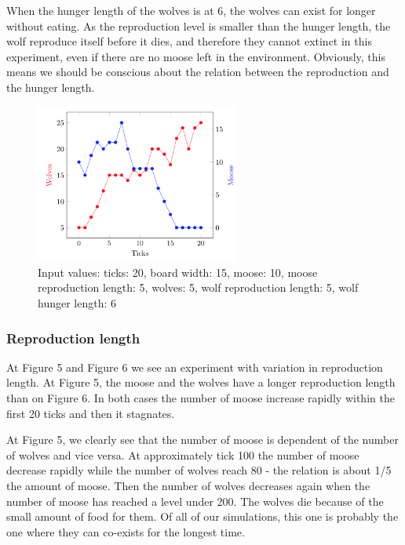 \documentclass[a4paper]{report}
\begin{document}
When the hunger length of the wolves is at 6, the wolves can exist for longer without eating. As the reproduction level is smaller than the hunger length, the wolf reproduce itself before it dies, and therefore they cannot extinct in this experiment, even if there are no moose left in the environment. Obviously, this means we should be conscious about the relation between the reproduction and the hunger length.

\begin{figure}[H]
\centering
\includegraphics[width=0.60\textwidth]{Experiments/sim_hunlen_a2}
\caption{Input values: ticks: 20, board width: 15, moose: 10, moose reproduction length: 5, wolves: 5, wolf reproduction length: 5, wolf hunger length: 6}
\end{figure}


\subsubsection*{Reproduction length}
At Figure 5 and Figure 6 we see an experiment with variation in reproduction length. At Figure 5, the moose and the wolves have a longer reproduction length than on Figure 6. In both cases the number of moose increase rapidly within the first 20 ticks and then it stagnates.
 
At Figure 5, we clearly see that the number of moose is dependent of the number of wolves and vice versa. At approximately tick 100 the number of moose decrease rapidly while the number of wolves reach 80 - the relation is about 1/5 the amount of moose. Then the number of wolves decreases again when the number of moose has reached a level under 200. The wolves die because of the small amount of food for them. \newline 
Of all of our simulations, this one is probably the one where they can co-exists for the longest time.
\end{document}

